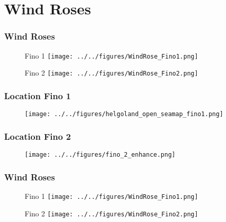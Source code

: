 \documentclass[12pt,t]{beamer}
\begin{document}
\section{Wind Roses}
\begin{frame}
	\frametitle{Wind Roses}
\begin{figure}[htbp]
	\begin{center}
		\begin{minipage}[t]{0.45\linewidth}
			\centering
			Fino 1
			\texttt{[image: ../../figures/WindRose\_Fino1.png]}
			\label{label 1}
		\end{minipage}
		\begin{minipage}[t]{0.45\linewidth}
			\centering
			Fino 2
			\texttt{[image: ../../figures/WindRose\_Fino2.png]}
			\label{label 2}
		\end{minipage}
	\end{center}
\end{figure}
\end{frame}

\begin{frame}
\frametitle{Location Fino 1}
\begin{figure}[H]
\centering
\texttt{[image: ../../figures/helgoland\_open\_seamap\_fino1.png]}
\label{fig:fino1}
\end{figure} 
\end{frame}
\begin{frame}
\frametitle{Location Fino 2}
\begin{figure}[H]
\centering
\texttt{[image: ../../figures/fino\_2\_enhance.png]}
\label{fig:fino2}
\end{figure} 
\end{frame}
\begin{frame}
	\frametitle{Wind Roses}
\begin{figure}[htbp]
	\begin{center}
		\begin{minipage}[t]{0.45\linewidth}
			\centering
			Fino 1
			\texttt{[image: ../../figures/WindRose\_Fino1.png]}
			\label{label 1}
		\end{minipage}
		\begin{minipage}[t]{0.45\linewidth}
			\centering
			Fino 2
			\texttt{[image: ../../figures/WindRose\_Fino2.png]}
			\label{label 2}
		\end{minipage}
	\end{center}
\end{figure}
\end{frame}
\end{document}
